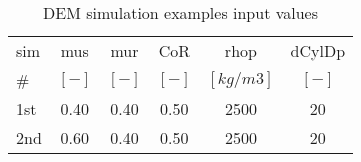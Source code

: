\begin{table}[h]
\centering
\begin{tabular}{lccccc}
\hline
 sim &  \acs{mus} & \acs{mur} & \acs{CoR} & \acs{rhop} & \acs{dCylDp} \\
  \#  &	$[-]$  & $[-]$   & $[-]$   & $[kg/m3]$ & $[-]$ \\
          \hline
    1st & 0.40  & 0.40  & 0.50  & 2500  & 20 \\
    2nd & 0.60  & 0.40  & 0.50  & 2500  & 20 \\


\hline
\end{tabular}
\caption{DEM simulation examples input values}
\label{tab:11DEMSimExampleinputvalues}
\end{table}